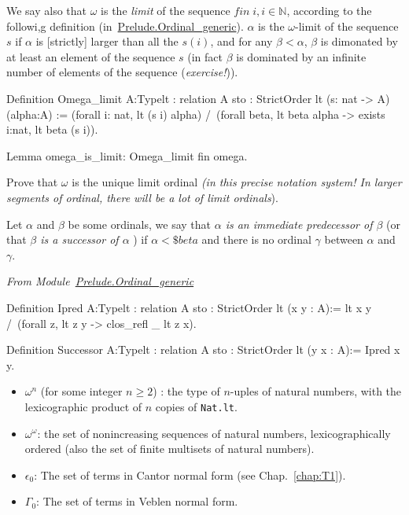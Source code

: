 We say also that $\omega$ is the \emph{limit} of the sequence $\textit{fin}\;i, i\in\mathbb{N}$, according to the followi,g definition (in~\href{../src/html/hydras.Prelude.Ordinal_generic.html}{Prelude.Ordinal\_generic}).
$\alpha$ is the $\omega$-limit of the sequence $s$ if $\alpha$ is [strictly] larger than all the $s(i)$, and for any
$\beta<\alpha$, $\beta$ is dimonated by at least an element of  the sequence $s$ (in fact $\beta$ is dominated by an infinite number of elements of the sequence (\emph{exercise!})).



\begin{Coqsrc}
Definition  Omega_limit
            {A:Type}{lt : relation A}
           {sto : StrictOrder lt} (s: nat -> A) (alpha:A)  :=
  (forall i: nat, lt (s i) alpha) /\
  (forall beta, lt beta  alpha -> exists i:nat, lt beta (s i)).

Lemma omega_is_limit:
   Omega_limit fin omega.
\end{Coqsrc}


\begin{exercise}
Prove that $\omega$ is the unique   limit ordinal \emph{(in this precise notation system! In larger segments of ordinal, there will be \emph{a lot} of limit ordinals}).
\end{exercise}

Let $\alpha$ and $\beta$ be some ordinals, we say that \emph{$\alpha$ is an immediate predecessor of $\beta$}
(or that \emph{$\beta$ is a  successor of $\alpha$ }) if $\alpha<\$beta$ and there is no ordinal $\gamma$ between $\alpha$ and $\gamma$.

\noindent\emph{From Module~\href{../src/html/hydras.Prelude.Ordinal_generic.html}{Prelude.Ordinal\_generic}}

\begin{Coqsrc}
Definition Ipred {A:Type}{lt : relation A}
           {sto : StrictOrder lt} (x y : A):=
  lt x y /\ (forall z,  lt z y -> clos_refl _ lt z x).

Definition Successor {A:Type}{lt : relation A}
           {sto : StrictOrder lt} (y x : A):= Ipred x y.
\end{Coqsrc}

\begin{itemize}
\item $\omega^n$ (for some  integer  $n\geq 2$) : the type of $n$-uples of natural numbers, with the lexicographic product of $n$ copies of \texttt{Nat.lt}.
\item  $\omega^\omega$: the set of nonincreasing sequences of natural numbers, lexicographically ordered (also the set of finite multisets of natural numbers).
\item $\epsilon_0$: The set of terms in Cantor normal form (see Chap.~\ref{chap:T1}).
\item $\Gamma_0$: The set of terms in Veblen normal form.
\end{itemize}



